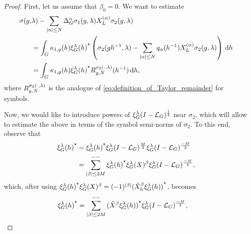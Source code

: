 \begin{proof}
    First, let us assume that $\beta_0 = 0$.
    We want to estimate
    \begin{align}
        \sigma(g, &\lambda) - \sum_{\left|{\alpha}\right| \leq N} {\Delta_{G}^{\alpha}} \sigma_1(g, \lambda) X^{(\alpha)}_L \sigma_2(g, \lambda) \notag\\
        &= \int_G \kappa_{1, g}(h) {\xi^{\lambda}_{G}(h)}^\star
        \left(\sigma_2(g h^{-1}, \lambda) - \sum_{\left|{\alpha}\right| \leq N} q_\alpha(h^{-1}) X^{(\alpha)}_L \sigma_2(g, \lambda)\right) \,\mathrm{d} h \notag\\
        &= \int_G \kappa_{1, g}(h) {\xi^{\lambda}_{G}(h)}^\star R^{\sigma_2(\cdot, \lambda)}_{g, N} (h^{-1}) \,\mathrm{d} h,
        \label{eq:remainder_of_composition_formula}
    \end{align}
    where $R^{\sigma_2(\cdot, \lambda)}_{g, N}$ is the analogue of \eqref{eq:definition_of_Taylor_remainder} for symbols.

    Now, we would like to introduce powers of $\xi^{\lambda}_{G} {(I - {\mathcal{L}_{G}})^\frac{1}{2}}$ near $\sigma_2$,
    which will allow to estimate the above in terms of the symbol semi-norms of $\sigma_2$.
    To this end,
    observe that
    \begin{align*}
        {\xi^{\lambda}_{G}(h)}^\star
        &= {\xi^{\lambda}_{G}(h)}^\star \xi^{\lambda}_{G} {(I - {\mathcal{L}_{G}})^\frac{M}{2}} \xi^{\lambda}_{G} {(I - {\mathcal{L}_{G}})^\frac{-M}{2}}\\
        &= \sum_{\left|{\beta}\right| \leq 2 M}^{--} {\xi^{\lambda}_{G}(h)}^\star \xi^{\lambda}_{G}(X)^\beta \xi^{\lambda}_{G} {(I - {\mathcal{L}_{G}})^\frac{-M}{2}},
    \end{align*}
    which, after using $\adj {\Rep \lambda(h)} \Rep \lambda (X)^\beta = (-1)^{\abs \beta} \adj {(\RightDifferentialOperator[h] \beta \Rep \lambda (h))}$, becomes
    \begin{align*}
        \adj{\Rep \lambda(h)}
        &= \lcsum{\abs \beta \leq 2 M} \adj{(\RightDifferentialOperator \beta \Rep \lambda(h))} \Rep \lambda \BesselPotential {-M},
    \end{align*}


\end{proof}
